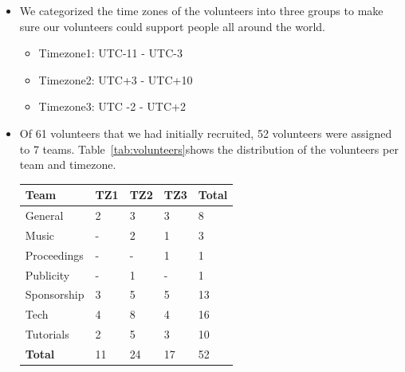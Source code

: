 \documentclass[%
10pt,								%
]
{scrartcl}
\begin{document}
        \begin{itemize}
            \item We categorized the time zones of the volunteers into three groups to make sure our volunteers could support people all around the world.
                \begin{itemize}
                    \item Timezone1: UTC-11 - UTC-3
                    \item   Timezone2: UTC+3 - UTC+10
                    \item   Timezone3: UTC -2 - UTC+2
                \end{itemize}
            \item   Of 61 volunteers that we had initially recruited, 52 volunteers were assigned to 7 teams. Table~\ref{tab:volunteers}shows the distribution of the volunteers per team and timezone. 
                \begin{table}
                    \begin{tabular}{l|l|l|l|l}
                        \textbf{Team} & \textbf{TZ1} & \textbf{TZ2} & \textbf{TZ3} & \textbf{Total}\\ \hline
                        
                        General & 2 & 3 & 3 & 8\\
                        Music & - & 2 & 1 & 3\\
                        Proceedings & - & - & 1 & 1\\
                        Publicity & - & 1 & - & 1\\
                        Sponsorship & 3 & 5 & 5 & 13\\
                        Tech & 4 & 8 & 4 & 16\\
                        Tutorials & 2 & 5 & 3 & 10\\
                        \hline
                        \textbf{Total} & 11 & 24 & 17 & 52
                    

\end{tabular}
\end{table}
\end{itemize}
\end{document}
